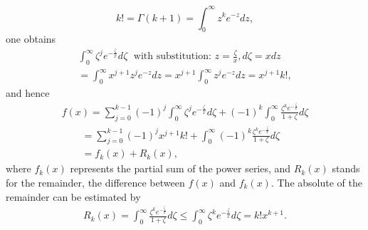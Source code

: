 {\begin{equation}
k!= \Gamma(k+1)=    \int_0^\infty z^k e^{-z} dz,
\label{2011-m-ch-dsee15}
\end{equation}
one obtains
\begin{equation}
\begin{split}
\int_0^\infty  \zeta^j  e^{-\frac{\zeta}{x}}   d\zeta  \;
\textrm{ with substitution:  }z=\frac{\zeta}{x}, d \zeta =x dz    \\
= \int_0^\infty x^{j+1} z^j  e^{-z}   dz
= x^{j+1}\int_0^\infty  z^j  e^{-z}   dz
=  x^{j+1} k! ,
\end{split}
\label{2011-m-ch-dsee16}
\end{equation}
and hence
\begin{equation}
\begin{split}
f(x)  =
\sum_{j=0}^{k-1}(-1)^j\int_0^\infty  \zeta^j  e^{-\frac{\zeta}{x}}   d\zeta
 +
(-1)^k \int_0^\infty \frac{\zeta^ke^{-\frac{\zeta}{x}}}{1+\zeta}
d\zeta  \\
\qquad =
\sum_{j=0}^{k-1}  (-1)^j x^{j+1} k!
 +
\int_0^\infty (-1)^k \frac{\zeta^k e^{-\frac{\zeta}{x}}}{1+\zeta}
d\zeta  \\
\qquad =
f_k(x)  +R_k(x),
\end{split}
\label{2011-m-ch-dsee17}
\end{equation}
where $f_k(x)$ represents the partial sum of the power series, and $R_k(x)$ stands for the remainder,
the difference between $f(x)$ and $f_k(x)$.
The absolute of the remainder can be estimated by
\begin{equation}
\begin{split}
 R_k(x)
=
\int_0^\infty  \frac{\zeta^k e^{-\frac{\zeta}{x}}}{1+\zeta} d\zeta
\le
\int_0^\infty  \zeta^k e^{-\frac{\zeta}{x}} d\zeta
 = k! x^{k+1}.
\end{split}
\label{2011-m-ch-dsee18}
\end{equation}
\eproof
}



